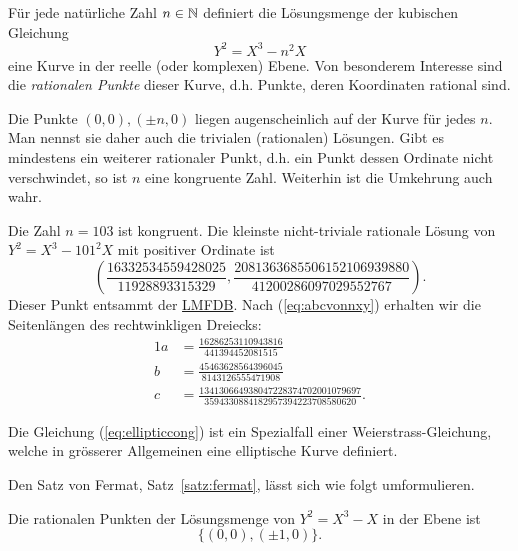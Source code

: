 Für jede natürliche Zahl $n\in{\mathbb{N}}$ definiert
die Lösungsmenge der kubischen Gleichung
\begin{equation}
  \label{eq:ellipticcong}
  Y^2 = X^3-n^2X  
\end{equation}
eine Kurve in der reelle (oder komplexen) Ebene. Von besonderem
Interesse sind die \emph{rationalen Punkte} dieser Kurve, d.h. Punkte,
deren Koordinaten rational sind.

Die Punkte $(0,0),(\pm n,0)$ liegen augenscheinlich auf der Kurve für
jedes $n$. Man nennst sie daher auch die trivialen (rationalen)
Lösungen.
Gibt es mindestens ein weiterer rationaler Punkt, d.h. ein
Punkt dessen Ordinate nicht verschwindet, so ist $n$ eine kongruente
Zahl.
Weiterhin ist die Umkehrung auch wahr. 

\begin{beispiel}
  Die Zahl $n=103$ ist kongruent. Die kleinste nicht-triviale
  rationale Lösung
  von $Y^2 = X^3-101^2X$ mit positiver Ordinate ist
  \begin{equation*}
    \left(\frac{16332534559428025}{11928893315329}, \frac{2081363685506152106939880}{41200286097029552767}\right).
  \end{equation*}
  Dieser Punkt entsammt der \href{https://www.lmfdb.org/EllipticCurve/Q/339488/b/3}{LMFDB}.
  Nach (\ref{eq:abcvonnxy}) erhalten wir die Seitenlängen des rechtwinkligen Dreiecks:
  \begin{alignat*}1
    a &=\frac{16286253110943816}{441394452081515}\\
    b &=\frac{45463628564396045}{8143126555471908}\\
    c &= \frac{134130664938047228374702001079697}{3594330884182957394223708580620}.
  \end{alignat*}
\end{beispiel}

Die Gleichung (\ref{eq:ellipticcong}) ist ein Spezialfall einer
Weierstrass-Gleichung, welche in grösserer Allgemeinen eine
elliptische Kurve definiert.

Den Satz von Fermat, Satz~\ref{satz:fermat}, lässt sich wie folgt
umformulieren.

\begin{theorem}
  \label{satz:fermat2}
  Die rationalen Punkten der Lösungsmenge von $Y^2 = X^3-X$ in der Ebene ist
  $$
  \{(0,0),(\pm 1,0)\}.
  $$
\end{theorem}


